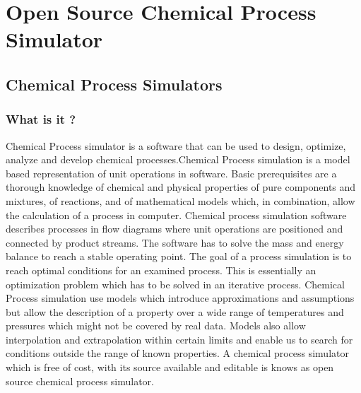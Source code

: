 \documentclass[12pt]{report}
\begin{document}
\chapter{Open Source Chemical Process Simulator}

\section{Chemical Process Simulators}

\subsection{What is it ?}
Chemical Process simulator is a software that can be used to design, optimize, analyze and develop chemical processes.Chemical Process simulation is a model based representation of unit operations in software. Basic prerequisites   are a thorough knowledge of chemical and physical properties of pure components and mixtures, of reactions, and of mathematical models which, in combination, allow the calculation of a process in computer.
Chemical process simulation software describes processes in flow diagrams where unit operations are positioned and connected by product streams. The software has to solve the mass and energy balance to reach a stable operating point. The goal of a process simulation is to reach optimal conditions for an examined process. This is essentially an optimization problem which has to be solved in an iterative process.
Chemical Process simulation use models which introduce approximations and assumptions but allow the description of a property over a wide range of temperatures and pressures which might not be covered by real data. Models also allow interpolation and extrapolation within certain limits and enable us to search for conditions outside the range of known properties.
A chemical process simulator which is free of cost, with its source available and editable is knows as open source chemical process simulator.
\end{document}
